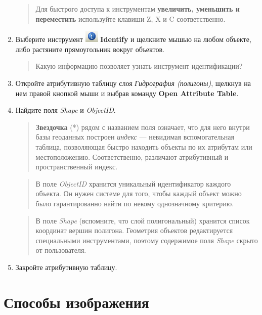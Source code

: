 \documentclass[]{book}
\theoremstyle{definition}
\theoremstyle{definition}
\theoremstyle{definition}
\theoremstyle{remark}
\begin{document}
\begin{enumerate}
  \begin{quote}
  Для быстрого доступа к инструментам \textbf{увеличить, уменьшить и
  переместить} используйте клавиши Z, X и C соответственно.
  \end{quote}
\item
  Выберите инструмент \includegraphics{images/Ex01/image14.png}
  \textbf{Identify} и щелкните мышью на любом объекте, либо растяните
  прямоугольник вокруг объектов.

  \begin{quote}
  Какую информацию позволяет узнать инструмент идентификации?
  \end{quote}
\item
  Откройте атрибутивную таблицу слоя \emph{Гидрография (полигоны)},
  щелкнув на нем правой кнопкой мыши и выбрав команду \textbf{Open
  Attribute Table}.
\item
  Найдите поля \emph{Shape} и \emph{ObjectID}.

  \begin{quote}
  \textbf{Звездочка} (*) рядом с названием поля означает, что для него
  внутри базы геоданных построен \emph{индекс} --- невидимая
  вспомогательная таблица, позволяющая быстро находить объекты по их
  атрибутам или местоположению. Соответственно, различают атрибутивный и
  пространственный индекс.
  \end{quote}

  \begin{quote}
  В поле \emph{ObjectID} хранится уникальный идентификатор каждого
  объекта. Он нужен системе для того, чтобы каждый объект можно было
  гарантированно найти по некому однозначному критерию.
  \end{quote}

  \begin{quote}
  В поле \emph{Shape} (вспомните, что слой полигональный) хранится
  список координат вершин полигона. Геометрия объектов редактируется
  специальными инструментами, поэтому содержимое поля \emph{Shape}
  скрыто от пользователя.
  \end{quote}
\item
  Закройте атрибутивную таблицу.
\end{enumerate}

\hypertarget{map-design-quaternary-representations}{%
\section{Способы
изображения}\label{map-design-quaternary-representations}}
\end{document}
